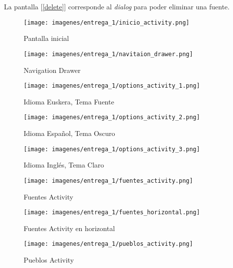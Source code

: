 \documentclass[11pt,a4paper]{article}
\begin{document}
    La pantalla [\ref{delete}] corresponde al \textit{dialog} para poder eliminar una fuente.\\


\begin{figure}[H]
    \centering
    \texttt{[image: imagenes/entrega\_1/inicio\_activity.png]}
    \caption{Pantalla inicial}
    \label{inicio}
\end{figure}
\begin{figure}[H]
    \centering
    \texttt{[image: imagenes/entrega\_1/navitaion\_drawer.png]}
    \caption{Navigation Drawer}
    \label{nav_drawer}
\end{figure}

\begin{figure}[H]
    \centering
    \texttt{[image: imagenes/entrega\_1/options\_activity\_1.png]}
    \caption{Idioma Euskera, Tema Fuente}
    \label{opt1}
\end{figure}
\begin{figure}[H]
    \centering
    \texttt{[image: imagenes/entrega\_1/options\_activity\_2.png]}
    \caption{Idioma Español, Tema Oscuro}
    \label{opt2}
\end{figure}
\begin{figure}[H]
    \centering
    \texttt{[image: imagenes/entrega\_1/options\_activity\_3.png]}
    \caption{Idioma Inglés, Tema Claro}
    \label{opt3}
\end{figure}

\begin{figure}[H]
    \centering
    \texttt{[image: imagenes/entrega\_1/fuentes\_activity.png]}
    \caption{Fuentes Activity}
    \label{fuentes}
\end{figure}
\begin{figure}[H]
    \centering
    \texttt{[image: imagenes/entrega\_1/fuentes\_horizontal.png]}
    \caption{Fuentes Activity en horizontal}
    \label{fuentes_hori}
\end{figure}
\begin{figure}[H]
    \centering
    \texttt{[image: imagenes/entrega\_1/pueblos\_activity.png]}
    \caption{Pueblos Activity}
    \label{municipios}
\end{figure}
\end{document}

